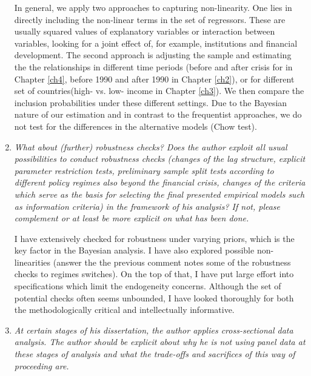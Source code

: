\begin{enumerate}
    In general, we apply two approaches to capturing non-linearity. One lies in directly including the non-linear terms in the set of regressors. These are usually squared values of explanatory variables or interaction between variables, looking for a joint effect of, for example, institutions and financial development. The second approach is adjusting the sample and estimating the the relationships in different time periods (before and after crisis for in Chapter \ref{ch4}, before 1990 and after 1990 in Chapter \ref{ch2}), or for different set of countries(high- vs. low- income in Chapter \ref{ch3}). We then compare the inclusion probabilities under these different settings. Due to the Bayesian nature of our estimation and in contrast to the frequentist approaches, we do not test for the differences in the alternative models (Chow test).

    \item \textit{What about (further) robustness checks? Does the author exploit all usual possibilities to conduct robustness checks (changes of the lag structure, explicit parameter restriction tests, preliminary sample split tests according to different policy regimes also beyond the financial crisis, changes of the criteria which serve as the basis for selecting the final presented empirical models such as information criteria) in the framework of his analysis? If not, please complement or at least be more explicit on what has been done.}

    I have extensively checked for robustness under varying priors, which is the key factor in the Bayesian analysis. I have also explored possible non-linearities (answer the the previous comment  notes some of the robustness checks to regimes switches). On the top of that, I have put large effort into specifications which limit the endogeneity concerns. Although the set of potential checks often seems unbounded, I have looked thoroughly for both the methodologically critical and intellectually informative.

    \item \textit{At certain stages of his dissertation, the author applies cross-sectional data analysis. The author should be explicit about why he is not using panel data at these stages of analysis and what the trade-offs and sacrifices of this way of proceeding are.}
    

\end{enumerate}
